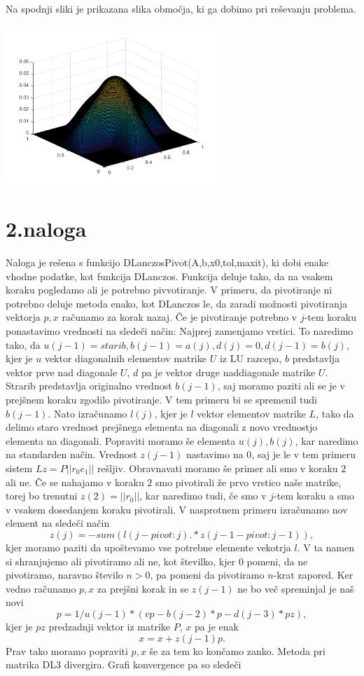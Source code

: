 \documentclass[11pt]{article} %
\begin{document}
Na spodnji sliki je prikazana slika območja, ki ga dobimo pri reševanju problema.

\includegraphics[width=0.6\textwidth]{slika1}

\section{2.naloga}

Naloga je rešena s funkcijo DLanczosPivot(A,b,x0,tol,maxit), ki dobi enake vhodne podatke, kot funkcija DLanczos. Funkcija deluje tako, da na vsakem koraku pogledamo ali je potrebno pivvotiranje. V primeru, da pivotiranje ni potrebno deluje metoda enako, kot DLanczos le, da zaradi možnosti pivotiranja vektorja $p,x$ računamo za korak nazaj. Če je pivotiranje potrebno v $j$-tem koraku ponastavimo vrednosti  na sledeči način:
Najprej zamenjamo vrstici. To naredimo tako, da
$u(j-1) = starib, b(j-1) = a(j), d(j) = 0, d(j-1)= b(j)$, kjer je $u$ vektor diagonalnih elementov matrike $U$ iz LU razcepa, $b$ predstavlja vektor prve nad diagonale $U$, $d$ pa je vektor druge naddiagonale matrike $U$. Strarib predstavlja originalno vrednost $b(j-1)$, saj moramo paziti ali se je v prejšnem koraku zgodilo pivotiranje. V tem primeru bi se spremenil tudi $b(j-1)$. Nato izračunamo $l(j)$, kjer je $l$ vektor elementov matrike $L$, tako da delimo staro vrednost prejšnega elementa na diagonali z novo vrednostjo elementa
na diagonali. Popraviti moramo še elementa $u(j),b(j)$, kar naredimo na standarden način. Vrednost $z(j-1)$ nastavimo na $0$, saj je le v tem primeru sistem $Lz=P||r_0e_1||$ rešljiv. Obravnavati moramo še primer ali smo v koraku $2$ ali ne. Če se nahajamo v koraku $2$ smo pivotirali že prvo vrstico naše matrike, torej bo trenutni $z(2)=||r_0||$, kar naredimo tudi, če smo v $j$-tem koraku a smo v vsakem dosedanjem koraku pivotirali. V nasprotnem primeru izračunamo nov element na sledeči način
$$z(j) = -sum(l(j-pivot:j).*z(j-1-pivot:j-1)),$$
kjer moramo paziti da upoštevamo vse potrebne elemente vekotrja $l$. V ta namen si shranjujemo ali pivotiramo ali ne, kot številko, kjer $0$ pomeni, da ne pivotiramo, naravno število $n>0$, pa pomeni da pivotiramo $n$-krat zapored. Ker vedno računamo $p,x$ za prejšni korak in se $z(j-1)$ ne bo več spreminjal je naš novi
$$p = 1/u(j-1)*(vp - b(j-2)*p-d(j-3)*pz),$$
 kjer je $pz$ predzadnji vektor iz matrike $P$, $x$ pa je enak
 $$x = x + z(j-1)p.$$
Prav tako moramo popraviti $p,x$ še za tem ko končamo zanko.
Metoda pri matrika DL3 divergira. Grafi konvergence pa so sledeči
\end{document}
